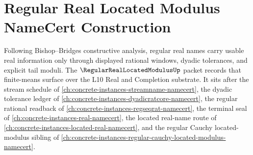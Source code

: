 \chapter{Regular Real Located Modulus NameCert Construction}
\label{ch:concrete-instances-regular-real-located-modulus-namecert}

Following Bishop--Bridges constructive analysis, regular real names carry usable real information only through displayed rational windows, dyadic tolerances, and explicit tail moduli. The $\RegularRealLocatedModulusUp$ packet records that finite-means surface over the L10 Real and Completion substrate. It sits after the stream schedule of \autoref{ch:concrete-instances-streamname-namecert}, the dyadic tolerance ledger of \autoref{ch:concrete-instances-dyadicratcore-namecert}, the regular rational readback of \autoref{ch:concrete-instances-regseqrat-namecert}, the terminal seal of \autoref{ch:concrete-instances-real-namecert}, the located real-name route of \autoref{ch:concrete-instances-located-real-namecert}, and the regular Cauchy located-modulus sibling of \autoref{ch:concrete-instances-regular-cauchy-located-modulus-namecert}.

